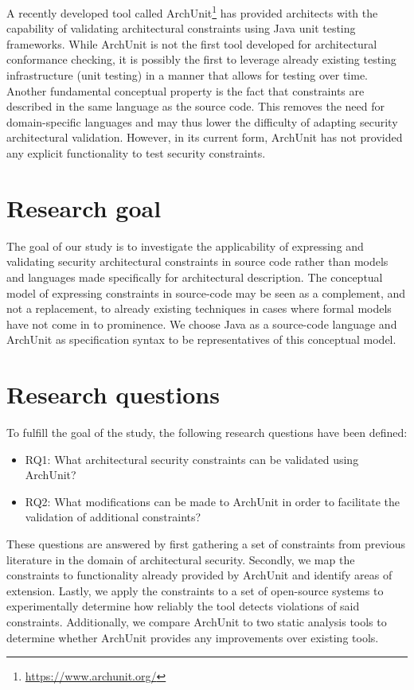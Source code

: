 A recently developed tool called ArchUnit\footnote{\url{https://www.archunit.org/}} has provided architects with the capability of validating architectural constraints using Java unit testing frameworks. While ArchUnit is not the first tool developed for architectural conformance checking, it is possibly the first to leverage already existing testing infrastructure (unit testing) in a manner that allows for testing over time. Another fundamental conceptual property is the fact that constraints are described in the same language as the source code. This removes the need for domain-specific languages and may thus lower the difficulty of adapting security architectural validation. However, in its current form, ArchUnit has not provided any explicit functionality to test security constraints.

\section{Research goal}
The goal of our study is to investigate the applicability of expressing and validating security architectural constraints in source code rather than models and languages made specifically for architectural description. The conceptual model of expressing constraints in source-code may be seen as a complement, and not a replacement, to already existing techniques in cases where formal models have not come in to prominence. We choose Java as a source-code language and ArchUnit as specification syntax to be representatives of this conceptual model.

\section{Research questions}
To fulfill the goal of the study, the following research questions have been defined:

\begin{itemize}
    \item RQ1: What architectural security constraints can be validated using ArchUnit?
    \item RQ2: What modifications can be made to ArchUnit in order to facilitate the validation of additional constraints?
\end{itemize}

These questions are answered by first gathering a set of constraints from previous literature in the domain of architectural security. Secondly, we map the constraints to functionality already provided by ArchUnit and identify areas of extension. Lastly, we apply the constraints to a set of open-source systems to experimentally determine how reliably the tool detects violations of said constraints. Additionally, we compare ArchUnit to two static analysis tools to determine whether ArchUnit provides any improvements over existing tools. 

